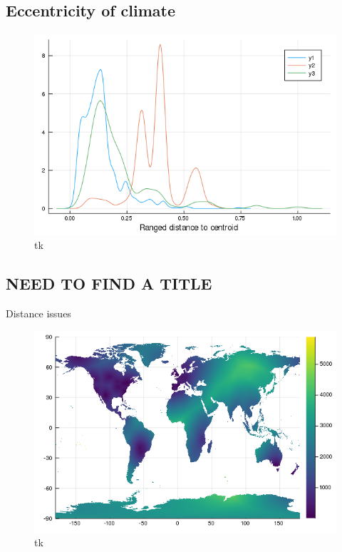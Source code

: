 \hypertarget{eccentricity-of-climate}{%
\subsection{Eccentricity of climate}\label{eccentricity-of-climate}}

\begin{figure}
\centering
\includegraphics{figures/figure_05_b.png}
\caption{tk\label{fig:ecc}}
\end{figure}

\hypertarget{need-to-find-a-title}{%
\subsection{NEED TO FIND A TITLE}\label{need-to-find-a-title}}

Distance issues

\begin{figure}
\centering
\includegraphics{figures/figure_03_a.png}
\caption{tk\label{fig:distance}}
\end{figure}

